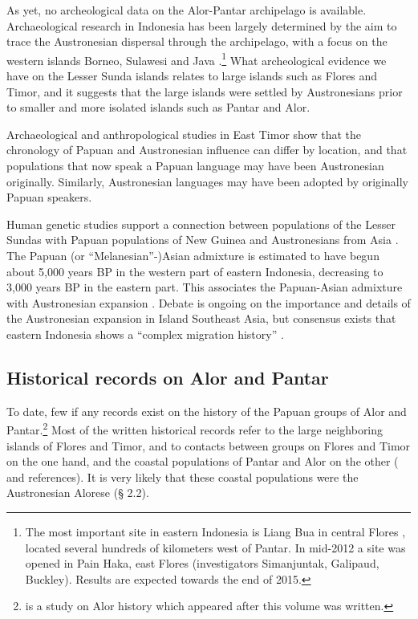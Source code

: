 As yet, no archeological data on the Alor-Pantar archipelago is available. Archaeological research in Indonesia has been largely determined by the aim to trace the Austronesian dispersal through the archipelago, with a focus on the western islands Borneo, Sulawesi and Java \citep{Mahirta2006}.\footnote{The
 most important site in eastern Indonesia is Liang Bua in central Flores \citep{MorwoodEtAl2004}, located several hundreds of kilometers west of Pantar.  In mid-2012 a site was opened in Pain Haka, east Flores (investigators Simanjuntak, Galipaud, Buckley). Results are expected towards the end of 2015.
} What archeological evidence we have on the Lesser Sunda islands relates to large islands such as Flores and Timor, and it suggests that the large islands were settled by Austronesians prior to smaller and more isolated islands such as Pantar and Alor. 

Archaeological and anthropological studies in East Timor \citep{OConnor2003,OConnor2007,McWilliam2007} show that the chronology of Papuan and Austronesian influence can differ by location, and that populations that now speak a Papuan language may have been Austronesian originally. Similarly, Austronesian languages may have been adopted by originally Papuan speakers.

Human genetic studies support a connection between populations of the Lesser Sundas with Papuan populations of New Guinea and Austronesians from Asia \citep{LansingEtAl2011,XuEtAl2012}. The Papuan (or ``Melanesian''-)Asian admixture is estimated to have begun about 5,000 years BP in the western part of eastern Indonesia, decreasing to 3,000 years BP in the eastern part. This associates the Papuan-Asian admixture with Austronesian expansion \citep{XuEtAl2012}. Debate is ongoing on the importance and details of the Austronesian expansion in Island Southeast Asia, but consensus exists that eastern Indonesia shows a ``complex migration history'' \citep[263]{LansingEtAl2011}.

\subsection{Historical records on Alor and Pantar}\label{sec:1:4.2}
To date, few if any records exist on the history of the Papuan groups of Alor and Pantar.\footnote{\citealt{Wellfelt2016} is a study on Alor history which appeared after this volume was written.} Most of the written historical records refer to the large neighboring islands of Flores and Timor, and to contacts between groups on Flores and Timor on the one hand, and the coastal populations of Pantar and Alor on the other (\citealt{Barnes1996,DeRoever2002,Steenbrink2003,Hagerdal2010cannibals,Hagerdal2010galens1,Hagerdal2011,Hagerdal2012} and references). It is very likely that these coastal populations were the Austronesian Alorese ({\S} 2.2). 

